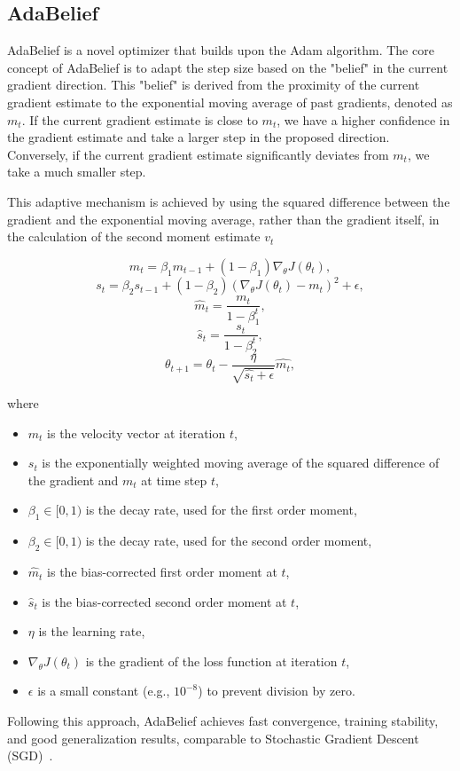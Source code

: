 \subsection{AdaBelief}
\label{sec:adabelief}


AdaBelief \cite{zhuang2020adabeliefoptimizeradaptingstepsizes} is a novel optimizer that builds
upon the Adam algorithm. The core concept of AdaBelief is to adapt the step size based on the
"belief" in the current gradient direction. This "belief" is derived from the proximity of the
current gradient estimate to the exponential moving average of past gradients, denoted as $m_t$.
If the current gradient estimate is close to $m_t$, we have a higher confidence in the gradient
estimate and take a larger step in the proposed direction. Conversely, if the current gradient
estimate significantly deviates from $m_t$, we take a much smaller step.

This adaptive mechanism is achieved by using the squared difference between the gradient
and the exponential moving average, rather than the gradient itself, in the calculation of the
second moment estimate $v_t$ \cite{zhuang2020adabelief}



\[m_t = \beta_1 m_{t-1} + (1 - \beta_1) \nabla_{\theta} J(\theta_t),\]
\[s_t = \beta_2 s_{t-1} + (1 - \beta_2) (\nabla_{\theta} J(\theta_t) - m_t)^2 + \epsilon,\]
\[\hat{m}_t = \frac{m_t}{1-\beta_1^t},\]
\[\hat{s}_t = \frac{s_t}{1-\beta_2^t},\]
\[\theta_{t+1} = \theta_t - \frac{\eta}{\sqrt{\hat{s_t} + \epsilon}} \hat{m_t},\]

where
\begin{itemize}
    \item $m_t$ is the velocity vector at iteration $t$,
    \item $s_t$ is the exponentially weighted moving average of the squared difference of the gradient and $m_t$ at time step $t$,
    \item $\beta_1 \in [0, 1) $ is the decay rate, used for the first order moment,
    \item $\beta_2 \in [0, 1) $ is the decay rate,  used for the second order moment,
    \item $\hat{m}_t$ is the bias-corrected first order moment at $t$,
    \item $\hat{s}_t$ is the bias-corrected second order moment at $t$,
    \item $\eta$ is the learning rate,
    \item $\nabla_{\theta} J(\theta_t)$ is the gradient of the loss function at iteration $t$,
    \item $\epsilon$ is a small constant (e.g., $10^{-8}$) to prevent division by zero.
\end{itemize}
Following this approach, AdaBelief achieves fast convergence, training stability, and good generalization results, comparable to Stochastic Gradient Descent (SGD)~\cite{zhuang2020adabelief}.


